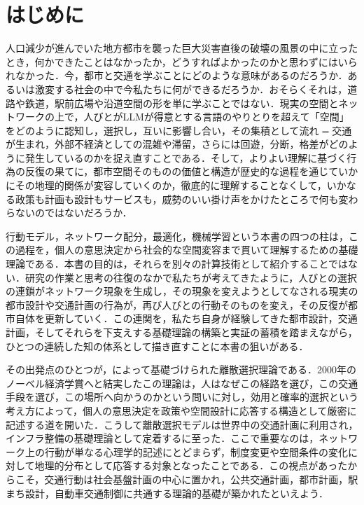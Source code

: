 \chapter{はじめに}

人口減少が進んでいた地方都市を襲った巨大災害直後の破壊の風景の中に立ったとき，何かできたことはなかったか，どうすればよかったのかと思わずにはいられなかった．今，都市と交通を学ぶことにどのような意味があるのだろうか．あるいは激変する社会の中で今私たちに何ができるだろうか．おそらくそれは，道路や鉄道，駅前広場や沿道空間の形を単に学ぶことではない．現実の空間とネットワークの上で，人びとがLLMが得意とする言語のやりとりを超えて「空間」をどのように認知し，選択し，互いに影響し合い，その集積として流れ$=$交通が生まれ，外部不経済としての混雑や滞留，さらには回遊，分断，格差がどのように発生しているのかを捉え直すことである．そして，よりよい理解に基づく行為の反復の果てに，都市空間そのものの価値と構造が歴史的な過程を通じていかにその地理的関係が変容していくのか，徹底的に理解することなくして，いかなる政策も計画も設計もサービスも，威勢のいい掛け声をかけたところで何も変わらないのではないだろうか．

行動モデル，ネットワーク配分，最適化，機械学習という本書の四つの柱は，この過程を，個人の意思決定から社会的な空間変容まで貫いて理解するための基礎理論である．本書の目的は，それらを別々の計算技術として紹介することではない．研究の作業と思考の往復のなかで私たちが考えてきたように，人びとの選択の連鎖がネットワーク現象を生成し，その現象を変えようとしてなされる現実の都市設計や交通計画の行為が，再び人びとの行動そのものを変え，その反復が都市自体を更新していく．この連関を，私たち自身が経験してきた都市設計，交通計画，そしてそれらを下支えする基礎理論の構築と実証の蓄積を踏まえながら，ひとつの連続した知の体系として描き直すことに本書の狙いがある．

その出発点のひとつが，\citet{McFadden1974}によって基礎づけられた離散選択理論である．2000年のノーベル経済学賞へと結実したこの理論は，人はなぜこの経路を選び，この交通手段を選び，この場所へ向かうのかという問いに対し，効用と確率的選択という考え方によって，個人の意思決定を政策や空間設計に応答する構造として厳密に記述する道を開いた．こうして離散選択モデルは世界中の交通計画に利用され，インフラ整備の基礎理論として定着するに至った．ここで重要なのは，ネットワーク上の行動が単なる心理学的記述にとどまらず，制度変更や空間条件の変化に対して地理的分布として応答する対象となったことである．この視点があったからこそ，交通行動は社会基盤計画の中心に置かれ，公共交通計画，都市計画，駅まち設計，自動車交通制御に共通する理論的基礎が築かれたといえよう．

